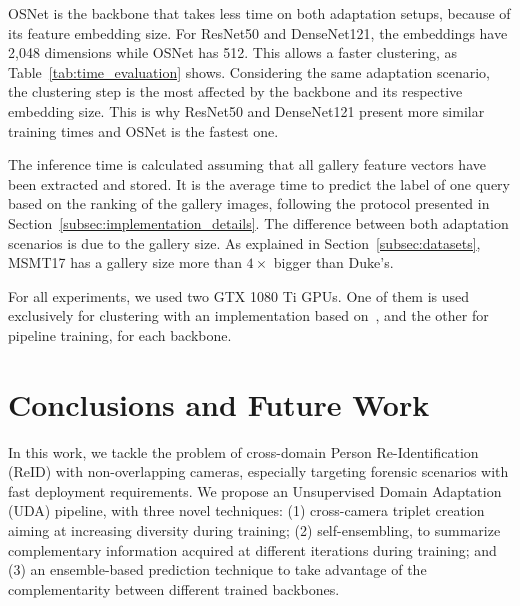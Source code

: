 \documentclass[journal]{IEEEtran}
\begin{document}
OSNet is the backbone that takes less time on both adaptation setups, because of its feature embedding size. For ResNet50 and DenseNet121, the embeddings have 2,048 dimensions while OSNet has 512. This allows a faster clustering, as Table~\ref{tab:time_evaluation} shows. Considering the same adaptation scenario, the clustering step is the most affected by the backbone and its respective embedding size. This is why ResNet50 and DenseNet121 present more similar training times and OSNet is the fastest one. 

The inference time is calculated assuming that all gallery feature vectors have been extracted and stored. It is the average time to predict the label of one query based on the ranking of the gallery images, following the protocol presented in Section~\ref{subsec:implementation_details}. The difference between both adaptation scenarios is due to the gallery size. As explained in Section~\ref{subsec:datasets}, MSMT17 has a gallery size more than $4\times$ bigger than Duke's. 

For all experiments, we used two GTX 1080 Ti GPUs. One of them is used exclusively for clustering with an implementation based on~\cite{melo2016hierarchical}, and the other for pipeline training, for each backbone. 


























\section{Conclusions and Future Work}
In this work, we tackle the problem of cross-domain Person Re-Identification (ReID) with non-overlapping cameras, especially targeting forensic scenarios with fast deployment requirements. We propose an Unsupervised Domain Adaptation (UDA) pipeline, with three novel techniques: (1) cross-camera triplet creation aiming at increasing diversity during training; (2) self-ensembling, to summarize complementary information acquired at different iterations during training; and (3) an ensemble-based prediction technique to take advantage of the complementarity between different trained backbones.
\end{document}

